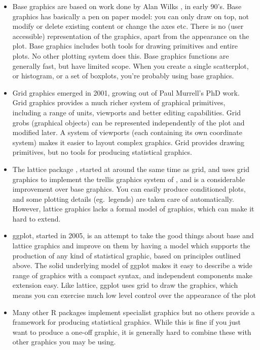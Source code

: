 \begin{itemize} 
	\item Base graphics are based on work done by Alan Wilks \citep{wilks:1995a,wilks:1995}, in early 90's.  Base graphics has basically a pen on paper model: you can only draw on top, not modify or delete existing content or change the axes etc.  There is no (user accessible) representation of the graphics, apart from the appearance on the plot. Base graphics includes both tools for drawing primitives and entire plots. No other plotting system does this.  Base graphics functions are generally fast, but have limited scope. When you create a single scatterplot, or histogram, or a set of boxplots, you're probably using base graphics.

	\item Grid graphics emerged in 2001, growing out of Paul Murrell's PhD work.  Grid graphics provides a much richer system of graphical primitives, including a range of units, viewports and better editing capabilities. Grid grobs (graphical objects) can be represented independently of the plot and modified later. A system of viewports (each containing its own coordinate system) makes it easier to layout complex graphics. Grid provides drawing primitives, but no tools for producing statistical graphics.  

	\item The lattice package \citep{sarkar:2005}, started at around the same time as grid, and  uses grid graphics to implement the trellis graphics system of \citet{cleveland:1993,cleveland:1994}, and is a considerable improvement over base graphics.  You can easily produce conditioned plots, and some plotting details (eg.\ legends) are taken care of automatically.  However, lattice graphics lacks a formal model of graphics, which can make it hard to extend.

	\item ggplot, started in 2005, is an attempt to take the good things about base and lattice graphics and improve on them by having a model which supports the production of any kind of statistical graphic, based on principles outlined above.  The solid underlying model of ggplot makes it easy to describe a wide range of graphics with a compact syntax, and independent components make extension easy.  Like lattice, ggplot uses grid to draw the graphics, which means you can exercise much low level control over the appearance of the plot

	\item Many other R packages implement specialist graphics but no others provide a framework for producing statistical graphics. While this is fine if you just want to produce a one-off graphic, it is generally hard to combine these with other graphics you may be using.

\end{itemize}

